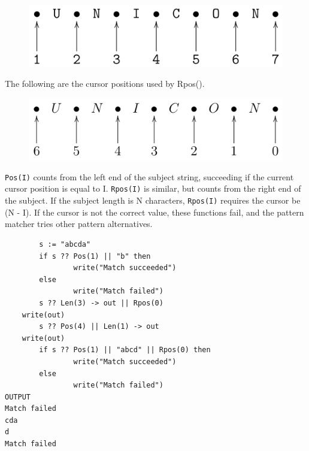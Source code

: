 \documentclass[letterpaper,12pt]{article}
\begin{document}
\begin{figure}[h]
\centering
\includegraphics[width=5in]{poscurs.png}
\end{figure}

\pagebreak

The following are the cursor positions used by Rpos().

\begin{figure}[h]
\centering
\includegraphics[width=5in]{rposcurs.png}
\end{figure}


{\tt Pos(I)} counts from the left end of the subject string, succeeding if
the current cursor position is equal to I. {\tt Rpos(I)} is similar, but
counts from the right end of the subject. If the subject length is N
characters, {\tt Rpos(I)} requires the cursor be (N - I). If the cursor is
not the correct value, these functions fail, and the pattern matcher
tries other pattern alternatives.

\begin{verbatim}
        s := "abcda"
        if s ?? Pos(1) || "b" then
                write("Match succeeded")
        else
                write("Match failed")
        s ?? Len(3) -> out || Rpos(0) 
	write(out)
        s ?? Pos(4) || Len(1) -> out
	write(out)
        if s ?? Pos(1) || "abcd" || Rpos(0) then
                write("Match succeeded")
        else
                write("Match failed")
OUTPUT
Match failed
cda
d
Match failed
\end{verbatim}
\end{document}

